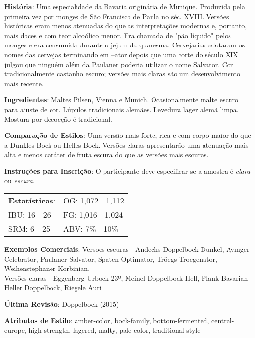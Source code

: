 \textbf{História}: Uma especialidade da Bavaria originária de Munique. Produzida pela primeira vez por monges de São Francisco de Paula no séc. XVIII. Versões históricas eram menos atenuadas do que as interpretações modernas e, portanto, mais doces e com teor alcoólico menor. Era chamada de "pão líquido" pelos monges e era consumida durante o jejum da quaresma. Cervejarias adotaram os nomes das cervejas terminando em –ator depois que uma corte do século XIX julgou que ninguém além da Paulaner poderia utilizar o nome Salvator. Cor tradicionalmente castanho escuro; versões mais claras são um desenvolvimento mais recente.

\textbf{Ingredientes}: Maltes Pilsen, Vienna e Munich. Ocasionalmente malte escuro para ajuste de cor. Lúpulos tradicionais alemães. Levedura lager alemã limpa. Mostura por decocção é tradicional.

\textbf{Comparação de Estilos}: Uma versão mais forte, rica e com corpo maior do que a Dunkles Bock ou Helles Bock. Versões claras apresentarão uma atenuação mais alta e menos caráter de fruta escura do que as versões mais escuras.

\textbf{Instruções para Inscrição}: O participante deve especificar se a amostra é \textit{clara} ou \textit{escura}.

\begin{tabular}{@{}p{35mm}p{35mm}@{}}
  \textbf{Estatísticas}: & OG: 1,072 - 1,112 \\
  IBU: 16 - 26 & FG: 1,016 - 1,024 \\
  SRM: 6 - 25 & ABV: 7\% - 10\%
\end{tabular}

\textbf{Exemplos Comerciais}: Versões escuras - Andechs Doppelbock Dunkel, Ayinger Celebrator, Paulaner Salvator, Spaten Optimator, Tröegs Troegenator, Weihenstephaner Korbinian.\\
Versões claras - Eggenberg Urbock 23º, Meinel Doppelbock Hell, Plank Bavarian Heller Doppelbock, Riegele Auri

\textbf{Última Revisão}: Doppelbock (2015)

\textbf{Atributos de Estilo}: amber-color, bock-family, bottom-fermented, central-europe, high-strength, lagered, malty, pale-color, traditional-style
